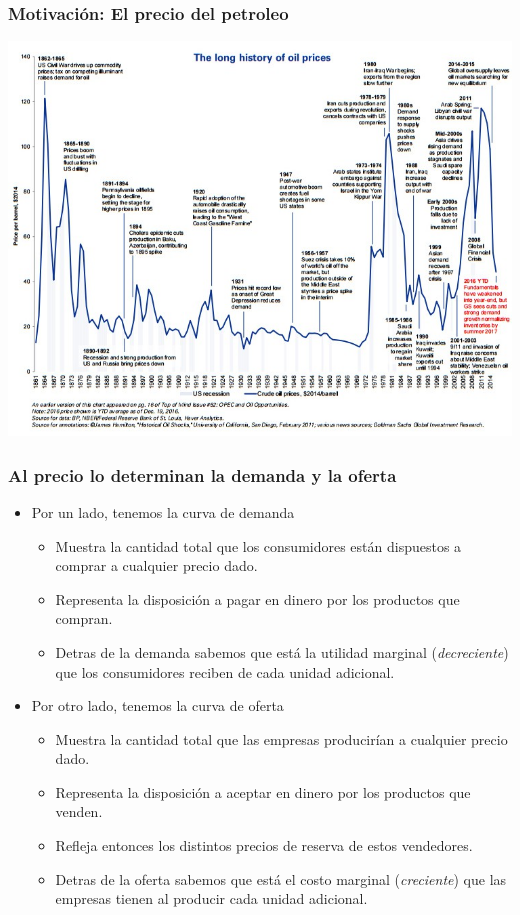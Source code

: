 \documentclass{beamer}
\begin{document}
\begin{frame}
\frametitle{Motivación: El precio del petroleo}
\centering
\includegraphics[scale=0.35]{../Figures/Tema_04.01_new.jpg}
\end{frame} 

\begin{frame}
\frametitle{Al precio lo determinan la demanda y la oferta}
\begin{itemize}
    \item Por un lado, tenemos la curva de demanda
    \begin{itemize}
        \item Muestra la cantidad total que los consumidores están dispuestos a comprar a cualquier precio dado.
        \item Representa la disposición a pagar en dinero por los productos que compran.
        \item Detras de la demanda sabemos que está la utilidad marginal (\textit{decreciente}) que los consumidores reciben de cada unidad adicional.
    \end{itemize}
    \item Por otro lado, tenemos la curva de oferta
    \begin{itemize}
        \item Muestra la cantidad total que las empresas producirían a cualquier precio dado.
        \item Representa la disposición a aceptar en dinero por los productos que venden.
        \item Refleja entonces los distintos precios de reserva de estos vendedores.
        \item Detras de la oferta sabemos que está el costo marginal (\textit{creciente}) que las empresas tienen al producir cada unidad adicional.
        \end{itemize}
\end{itemize}
\end{frame}
\end{document}
